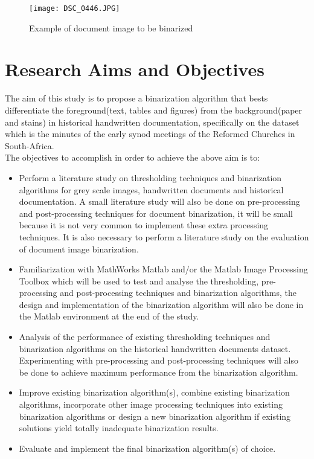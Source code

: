 \documentclass[11pt]{article}
\begin{document}
		\begin{figure}[h]
			\centering
			\texttt{[image: DSC\_0446.JPG]}
			\caption{Example of document image to be binarized} %
			\label{voorbeeld} %
		\end{figure}

	\section{Research Aims and Objectives} %
		The aim of this study is to propose a binarization algorithm that bests differentiate the foreground(text, tables and figures) from the background(paper and stains) in historical handwritten documentation, specifically on the dataset which is the minutes of the early synod meetings of the Reformed Churches in South-Africa.\\

	The objectives to accomplish in order to achieve the above aim is to:
	\begin{itemize}
		\item Perform a literature study on thresholding techniques and binarization algorithms for grey scale images, handwritten documents and historical documentation. A small literature study will also be done on pre-processing and post-processing techniques for document binarization, it will be small because it is not very common to implement these extra processing techniques. It is also necessary to perform a literature study on the evaluation of document image binarization.
		\newpage
		\item Familiarization with MathWorks Matlab and/or the Matlab Image Processing Toolbox which will be used to test and analyse the thresholding, pre-processing and post-processing techniques and binarization algorithms, the design and implementation of the binarization algorithm will also be done in the Matlab environment at the end of the study.
		\item Analysis of the performance of existing thresholding techniques and binarization algorithms on the historical handwritten documents dataset. Experimenting with pre-processing and post-processing techniques will also be done to achieve maximum performance from the binarization algorithm.
		\item Improve existing binarization algorithm(s), combine existing binarization algorithms, incorporate other image processing techniques into existing binarization algorithms or design a new binarization algorithm if existing solutions yield totally inadequate binarization results.
		\item Evaluate and implement the final binarization algorithm(s) of choice.
	\end{itemize}
\end{document}
